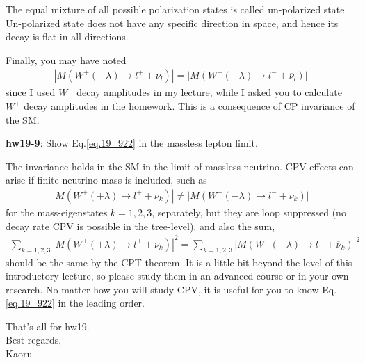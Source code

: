 \documentclass[12pt]{article}
\def\lmd{\lambda}
\begin{document}
The equal mixture of all possible polarization states is called
un-polarized state. Un-polarized state does not have any specific
direction in space, and hence its decay is flat in all directions.

Finally, you may have noted
\begin{eqnarray}
  |M(W^+(+\lmd) \to l^+ + \nu_l   )|
  = |M(W^-(-\lmd) \to l^- + {\overline \nu}_l)| \label{eq.19_922}
\end{eqnarray}
since I used $W^-$ decay amplitudes in my lecture, while I asked you
to calculate $W^+$ decay amplitudes in the homework.  This is a
consequence of CP invariance of the SM.

{\bf hw19-9}: Show Eq.\ref{eq.19_922} in the massless lepton limit.

The invariance holds in the SM in the limit of massless neutrino.
CPV effects can arise if finite neutrino mass is included, such as
\begin{eqnarray}
  |M(W^+(+\lmd) \to l^+ + \nu_k   )|
\neq |M(W^-(-\lmd) \to l^- + {\overline \nu}_k)| \label{eq.19_93}
\end{eqnarray}
for the mass-eigenstates $k=1,2,3$, separately, but they are loop
suppressed (no decay rate CPV is possible in the tree-level),
and also the sum,
\begin{eqnarray}
  \sum_{k=1,2,3} |M(W^+(+\lmd) \to l^+ + \nu_k   )|^2
  = \sum_{k=1,2,3} |M(W^-(-\lmd) \to l^- + {\overline \nu}_k)|^2 \label{eq.19_94}
\end{eqnarray}
should be the same by the CPT theorem.  It is a little bit beyond
the level of this introductory lecture, so please study them in an
advanced course or in your own research.  No matter how you will study
CPV, it is useful for you to know Eq.\ref{eq.19_922} in the leading order.

That's all for hw19.\\

Best regards,\\

Kaoru
\end{document}
